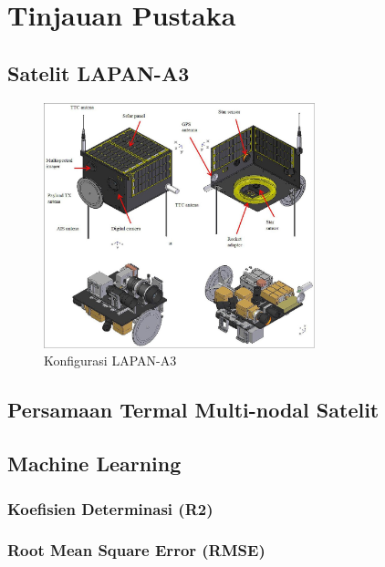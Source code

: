 \chapter{Tinjauan Pustaka}

\section{Satelit LAPAN-A3}

\begin{figure}[!ht]
\setlength{}
\begin{center}
\includegraphics[width=0.7\textwidth]{fig/a3overview.jpg}
\caption{Konfigurasi LAPAN-A3}
\label{fig:a3overview}
\end{center}
\end{figure}

\section{Persamaan Termal Multi-nodal Satelit}

\section{Machine Learning}

\subsection{Koefisien Determinasi (R2)}

\subsection{Root Mean Square Error (RMSE)}

